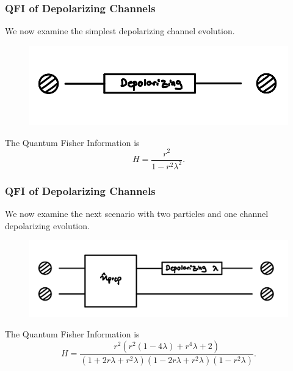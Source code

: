 \documentclass{beamer}
\begin{document}
\begin{frame}
\frametitle{QFI of Depolarizing Channels}
We now examine the simplest depolarizing channel evolution.
\begin{figure}
\begin{center}
\includegraphics[width=0.75\linewidth]{Depolarizing-Single-Channel-Lambda-Schematic.jpg}
\end{center}
\end{figure}
The Quantum Fisher Information is
\begin{equation}\label{eq:46}
H=\frac{r^2}{1-r^2\lambda^2}.
\end{equation}
\end{frame}
\begin{frame}
\frametitle{QFI of Depolarizing Channels}
We now examine the next scenario with two particles and one channel depolarizing evolution.
\begin{figure}
\begin{center}
\includegraphics[width=0.75\linewidth]{Depolarizing-Double-Channel-Lambda-Schematic.jpg}
\end{center}
\end{figure}
The Quantum Fisher Information is
\begin{equation}\label{eq:47}
H=\frac{r^2(r^2(1-4\lambda)+r^4\lambda+2)}{(1+2r\lambda+r^2\lambda)(1-2r\lambda+r^2\lambda)(1-r^2\lambda)}.
\end{equation}
\end{frame}
\end{document}
